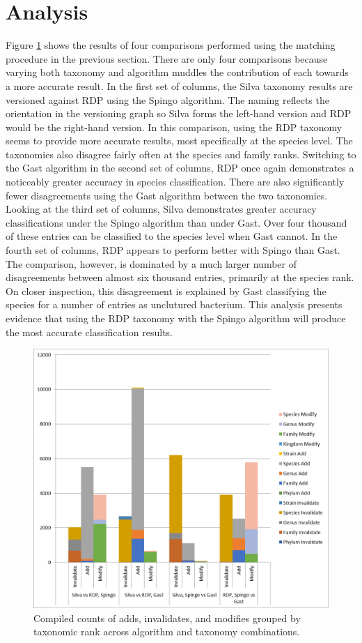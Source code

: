 \section{Analysis}

Figure \ref{mbvl_chart} shows the results of four comparisons performed using the matching procedure in the previous section.
There are only four comparisons because varying both taxonomy and algorithm muddles the contribution of each towards a more accurate result.
In the first set of columns, the Silva taxonomy results are versioned against RDP using the Spingo algorithm.
The naming reflects the orientation in the versioning graph so Silva forms the left-hand version and RDP would be the right-hand version.
In this comparison, using the RDP taxonomy seems to provide more accurate results, most specifically at the species level.
The taxonomies also disagree fairly often at the species and family ranks.
Switching to the Gast algorithm in the second set of columns, RDP once again demonstrates a noticeably greater accuracy in species classification.
There are also significantly fewer disagreements using the Gast algorithm between the two taxonomies.
Looking at the third set of columns, Silva demonstrates greater accuracy classifications under the Spingo algorithm than under Gast.
Over four thousand of these entries can be classified to the species level when Gast cannot.
In the fourth set of columns, RDP appears to perform better with Spingo than Gast.
The comparison, however, is dominated by a much larger number of disagreements between almost six thousand entries, primarily at the species rank.
On closer inspection, this disagreement is explained by Gast classifying the species for a number of entries as unclutured bacterium.
This analysis presents evidence that using the RDP taxonomy with the Spingo algorithm will produce the most accurate classification results.

\begin{figure}
	\centering
	\includegraphics[scale=0.80]{figures/mbvl_chart.png}
	\caption{Compiled counts of adds, invalidates, and modifies grouped by taxonomic rank across algorithm and taxonomy combinations.}
	\label{mbvl_chart}
\end{figure}